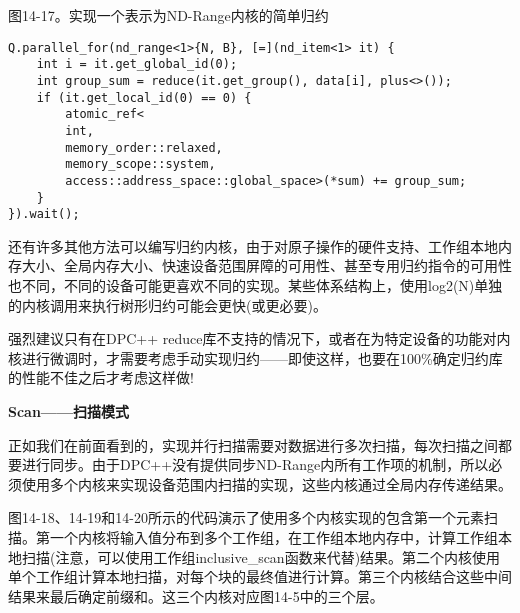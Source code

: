 \hspace*{\fill} \par %
图14-17。实现一个表示为ND-Range内核的简单归约
\begin{lstlisting}[caption={}]
Q.parallel_for(nd_range<1>{N, B}, [=](nd_item<1> it) {
	int i = it.get_global_id(0);
	int group_sum = reduce(it.get_group(), data[i], plus<>());
	if (it.get_local_id(0) == 0) {
		atomic_ref<
		int,
		memory_order::relaxed,
		memory_scope::system,
		access::address_space::global_space>(*sum) += group_sum;
	}
}).wait();
\end{lstlisting}

还有许多其他方法可以编写归约内核，由于对原子操作的硬件支持、工作组本地内存大小、全局内存大小、快速设备范围屏障的可用性、甚至专用归约指令的可用性也不同，不同的设备可能更喜欢不同的实现。某些体系结构上，使用log2(N)单独的内核调用来执行树形归约可能会更快(或更必要)。\par

强烈建议只有在DPC++ reduce库不支持的情况下，或者在为特定设备的功能对内核进行微调时，才需要考虑手动实现归约——即使这样，也要在100\%确定归约库的性能不佳之后才考虑这样做!\par

\hspace*{\fill} \par %
\textbf{Scan——扫描模式}

正如我们在前面看到的，实现并行扫描需要对数据进行多次扫描，每次扫描之间都要进行同步。由于DPC++没有提供同步ND-Range内所有工作项的机制，所以必须使用多个内核来实现设备范围内扫描的实现，这些内核通过全局内存传递结果。\par

图14-18、14-19和14-20所示的代码演示了使用多个内核实现的包含第一个元素扫描。第一个内核将输入值分布到多个工作组，在工作组本地内存中，计算工作组本地扫描(注意，可以使用工作组inclusive\_scan函数来代替)结果。第二个内核使用单个工作组计算本地扫描，对每个块的最终值进行计算。第三个内核结合这些中间结果来最后确定前缀和。这三个内核对应图14-5中的三个层。\par

